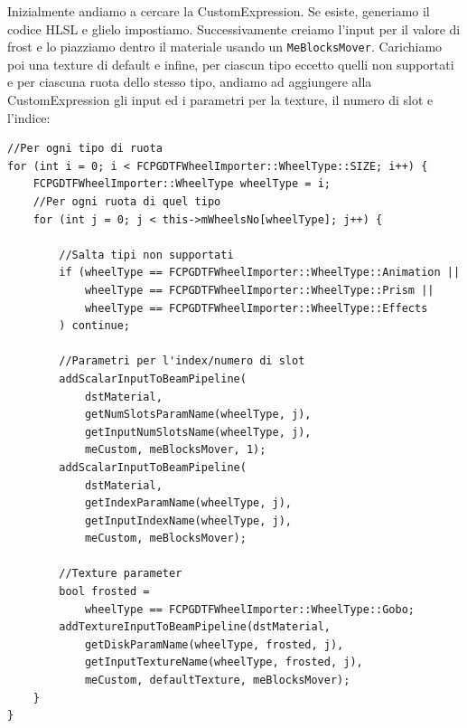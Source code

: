 \documentclass[main.tex]{subfiles}
\begin{document}
Inizialmente andiamo a cercare la CustomExpression. Se esiste, generiamo il codice HLSL e glielo impostiamo. Successivamente creiamo l'input per il valore di frost e lo piazziamo dentro il materiale usando un \lstinline{MeBlocksMover}.
%    
Carichiamo poi una texture di default e infine, per ciascun tipo eccetto quelli non supportati e per ciascuna ruota dello stesso tipo, andiamo ad aggiungere alla CustomExpression gli input ed i parametri per la texture, il numero di slot e l'indice:
\begin{lstlisting}
//Per ogni tipo di ruota
for (int i = 0; i < FCPGDTFWheelImporter::WheelType::SIZE; i++) {
    FCPGDTFWheelImporter::WheelType wheelType = i;
    //Per ogni ruota di quel tipo
    for (int j = 0; j < this->mWheelsNo[wheelType]; j++) {

        //Salta tipi non supportati
        if (wheelType == FCPGDTFWheelImporter::WheelType::Animation ||
            wheelType == FCPGDTFWheelImporter::WheelType::Prism ||
            wheelType == FCPGDTFWheelImporter::WheelType::Effects
        ) continue;

        //Parametri per l'index/numero di slot
        addScalarInputToBeamPipeline(
            dstMaterial,
            getNumSlotsParamName(wheelType, j),
            getInputNumSlotsName(wheelType, j),
            meCustom, meBlocksMover, 1);
        addScalarInputToBeamPipeline(
            dstMaterial,
            getIndexParamName(wheelType, j),
            getInputIndexName(wheelType, j),
            meCustom, meBlocksMover);

        //Texture parameter
        bool frosted =
            wheelType == FCPGDTFWheelImporter::WheelType::Gobo;
        addTextureInputToBeamPipeline(dstMaterial,
            getDiskParamName(wheelType, frosted, j),
            getInputTextureName(wheelType, frosted, j),
            meCustom, defaultTexture, meBlocksMover);
    }
}
\end{lstlisting}
\end{document}
